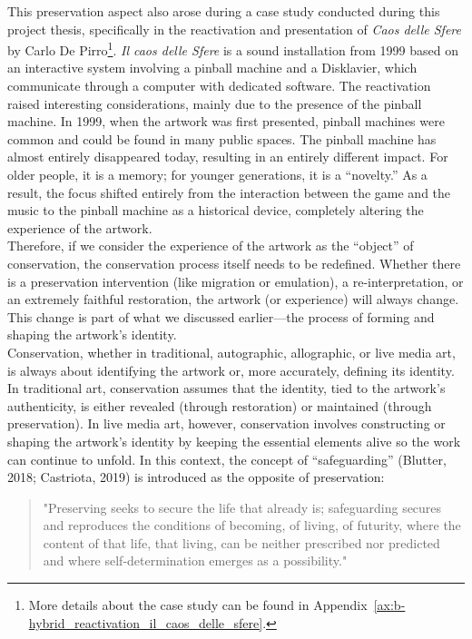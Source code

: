 This preservation aspect also arose during a case study conducted during this project thesis, specifically in the reactivation and presentation of \textit{Caos delle Sfere} by Carlo De Pirro\footnote{More details about the case study can be found in Appendix~\ref{ax:b-hybrid_reactivation_il_caos_delle_sfere}.}. \textit{Il caos delle Sfere} is a sound installation from 1999 based on an interactive system involving a pinball machine and a Disklavier, which communicate through a computer with dedicated software. The reactivation raised interesting considerations, mainly due to the presence of the pinball machine. In 1999, when the artwork was first presented, pinball machines were common and could be found in many public spaces. The pinball machine has almost entirely disappeared today, resulting in an entirely different impact. For older people, it is a memory; for younger generations, it is a ``novelty.'' As a result, the focus shifted entirely from the interaction between the game and the music to the pinball machine as a historical device, completely altering the experience of the artwork.\\
Therefore, if we consider the experience of the artwork as the ``object'' of conservation, the conservation process itself needs to be redefined. Whether there is a preservation intervention (like migration or emulation), a re-interpretation, or an extremely faithful restoration, the artwork (or experience) will always change. This change is part of what we discussed earlier—the process of forming and shaping the artwork’s identity.\\
Conservation, whether in traditional, autographic, allographic, or live media art, is always about identifying the artwork or, more accurately, defining its identity. In traditional art, conservation assumes that the identity, tied to the artwork’s authenticity, is either revealed (through restoration) or maintained (through preservation). In live media art, however, conservation involves constructing or shaping the artwork’s identity by keeping the essential elements alive so the work can continue to unfold.
In this context, the concept of ``safeguarding'' (Blutter, 2018; Castriota, 2019) is introduced as the opposite of preservation:
\begin{quote}
    "Preserving seeks to secure the life that already is; safeguarding secures and reproduces the conditions of becoming, of living, of futurity, where the content of that life, that living, can be neither prescribed nor predicted and where self-determination emerges as a possibility." \cite{butler2018my} 
\end{quote}
